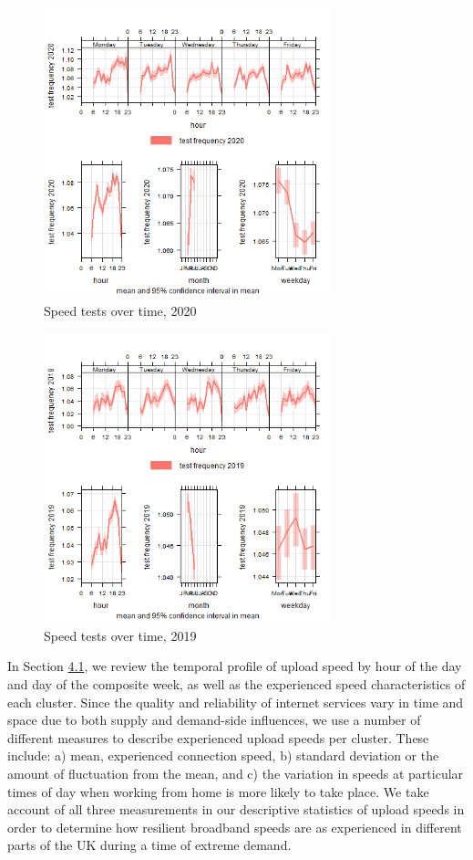 \documentclass[,]{sagej}
\begin{document}
\begin{figure}
\centering
\includegraphics[width=0.75\textwidth,height=0.4\textheight]{figures/time.var.plot2020.png}
\caption{Speed tests over time, 2020 \label{test2020}}
\end{figure}

\begin{figure}
\centering
\includegraphics[width=0.75\textwidth,height=0.4\textheight]{figures/time.var.plot2019.png}
\caption{Speed tests over time, 2019 \label{test2019}}
\end{figure}

In Section \protect\hyperlink{sec:4.1}{4.1}, we review the temporal
profile of upload speed by hour of the day and day of the composite
week, as well as the experienced speed characteristics of each cluster.
Since the quality and reliability of internet services vary in time and
space due to both supply and demand-side influences, we use a number of
different measures to describe experienced upload speeds per cluster.
These include: a) mean, experienced connection speed, b) standard
deviation or the amount of fluctuation from the mean, and c) the
variation in speeds at particular times of day when working from home is
more likely to take place. We take account of all three measurements in
our descriptive statistics of upload speeds in order to determine how
resilient broadband speeds are as experienced in different parts of the
UK during a time of extreme demand.
\end{document}
